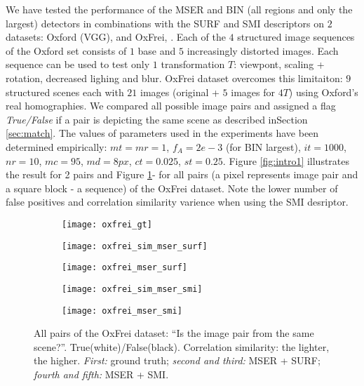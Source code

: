 \documentclass[a4paper,11pt]{article}
\begin{document}
We have tested the performance of the MSER and BIN (all regions and only the largest) detectors in combinations with the SURF and SMI descriptors on $2$ datasets: Oxford (VGG), \cite{Mikolajczyk:2005} and OxFrei, \cite{Ranguelova2016AICCSA}. Each of the $4$ structured image sequences of the Oxford set consists of $1$ base and $5$ increasingly distorted images. Each sequence can be used to test only $1$ transformation $T$: viewpont, scaling + rotation, decreased lighing and blur. OxFrei dataset overcomes this limitaiton: $9$ structured scenes each with $21$ images (original + $5$ images for $4 T$) using Oxford's real homographies. We compared all possible image pairs and assigned a flag {\em True/False} if a pair is depicting the same scene as described inSection \ref{sec:match}. The values of parameters used in the experiments have been determined empirically: $mt=mr=1$, $f_A=2e-3$ (for BIN largest), $it=1000$, $nr=10$, $mc=95$, $md=8px$, $ct=0.025$, $st=0.25$.
Figure \ref{fig:intro1} illustrates the result for 2 pairs and Figure \ref{fig:matching2}- for all pairs (a pixel represents image pair and a square block - a sequence) of the OxFrei dataset. Note the lower number of false positives and correlation similarity varience when using the SMI desriptor.

\begin{figure}[h]
 \vspace{-10pt} 
\begin{center}
\begin{subfigure}[b]{0.18\textwidth}
  \texttt{[image: oxfrei\_gt]}
\end{subfigure}
\begin{subfigure}[b]{0.18\textwidth}
\texttt{[image: oxfrei\_sim\_mser\_surf]}
\end{subfigure}
\begin{subfigure}[b]{0.18\textwidth}
  \texttt{[image: oxfrei\_mser\_surf]}
\end{subfigure}
\begin{subfigure}[b]{0.18\textwidth}
\texttt{[image: oxfrei\_sim\_mser\_smi]}
\end{subfigure}
\begin{subfigure}[b]{0.18\textwidth}
  \texttt{[image: oxfrei\_mser\_smi]}
\end{subfigure}
\end{center}
\vspace{-20pt}
\caption{\small  All pairs of the OxFrei dataset: ``Is the image pair from the same scene?''. True(white)/False(black).  Correlation similarity: the lighter, the higher. {\em First:} ground truth; {\em second and third:} MSER + SURF; {\em fourth and fifth:} MSER + SMI.}
\label{fig:matching2}
  \vspace{-12pt}
\end{figure}
\end{document}
